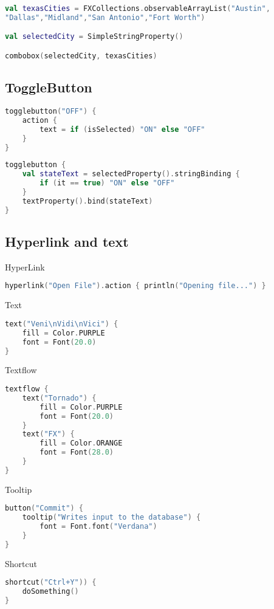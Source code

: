 \documentclass[12pt]{article}
\begin{document}
\begin{lstlisting}[language=Kotlin]
val texasCities = FXCollections.observableArrayList("Austin",
"Dallas","Midland","San Antonio","Fort Worth")

val selectedCity = SimpleStringProperty()

combobox(selectedCity, texasCities)
\end{lstlisting}
\subsection{ToggleButton}
\begin{lstlisting}[language=Kotlin]
togglebutton("OFF") {
	action {
		text = if (isSelected) "ON" else "OFF"
	}
}
\end{lstlisting}

\begin{lstlisting}[language=Kotlin]
togglebutton {
    val stateText = selectedProperty().stringBinding {
    	if (it == true) "ON" else "OFF"
    }
    textProperty().bind(stateText)
}
\end{lstlisting}

\subsection{Hyperlink and text}
HyperLink

\begin{lstlisting}[language=Kotlin]
hyperlink("Open File").action { println("Opening file...") }
\end{lstlisting}
Text

\begin{lstlisting}[language=Kotlin]
text("Veni\nVidi\nVici") {
	fill = Color.PURPLE
	font = Font(20.0)
}
\end{lstlisting}
Textflow

\begin{lstlisting}[language=Kotlin]
textflow {
	text("Tornado") {
		fill = Color.PURPLE
		font = Font(20.0)
	}
	text("FX") {
		fill = Color.ORANGE
		font = Font(28.0)
	}
}
\end{lstlisting}
Tooltip

\begin{lstlisting}[language=Kotlin]
button("Commit") {
	tooltip("Writes input to the database") {
		font = Font.font("Verdana")
	}
}
\end{lstlisting}
Shortcut

\begin{lstlisting}[language=Kotlin]
shortcut("Ctrl+Y")) {
	doSomething()
}
\end{lstlisting}
\end{document}
